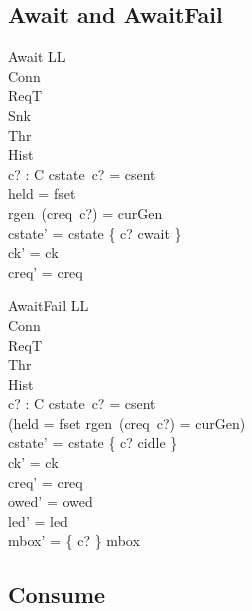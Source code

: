 \documentclass[a4paper,10pt,fleqn]{article}
\begin{document}
\subsection{Await and AwaitFail}

\begin{schema}{Await}
  \Delta LL \\
  \Xi Conn \\
  \Xi ReqT \\
  \Xi Snk \\
  \Xi Thr \\
  \Xi Hist \\
  c? : C
\where
  cstate~c? = csent \\
  held = fset \\
  rgen~(creq~c?) = curGen \\
  cstate' = cstate \oplus \{ c? \mapsto cwait \} \\
  ck' = ck \\
  creq' = creq
\end{schema}

\begin{schema}{AwaitFail}
  \Delta LL \\
  \Xi Conn \\
  \Xi ReqT \\
  \Xi Thr \\
  \Xi Hist \\
  c? : C
\where
  cstate~c? = csent \\
  \lnot (held = fset \land rgen~(creq~c?) = curGen) \\
  cstate' = cstate \oplus \{ c? \mapsto cidle \} \\
  ck' = ck \\
  creq' = creq \\
  owed' = owed \\
  led' = led \\
  mbox' = \{ c? \} \ndres mbox
\end{schema}

\subsection{Consume}
\end{document}
